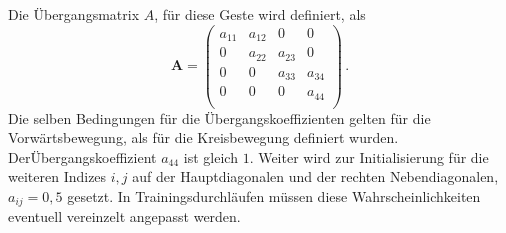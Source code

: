 Die \"Ubergangsmatrix $A$, f\"ur diese Geste wird definiert, als
\begin{equation}
\mathbf{A} = 
\begin{pmatrix}
a_{11} & a_{12} & 0 & 0\\
0 & a_{22} & a_{23} & 0 \\
0 & 0 & a_{33} & a_{34}\\
0 & 0 & 0 & a_{44} \\
\end{pmatrix} \, .
\end{equation}
Die selben Bedingungen f\"ur die \"Ubergangskoeffizienten gelten f\"ur die Vorw\"artsbewegung, als f\"ur die Kreisbewegung definiert wurden. 
\newline
Der\"Ubergangskoeffizient $a_{44}$ ist gleich $1$. Weiter wird zur Initialisierung f\"ur die weiteren Indizes $i, j$ auf der Hauptdiagonalen und der rechten Nebendiagonalen, $a_{ij} = 0,5$ gesetzt. In Trainingsdurchl\"aufen m\"ussen diese Wahrscheinlichkeiten eventuell vereinzelt angepasst werden.

